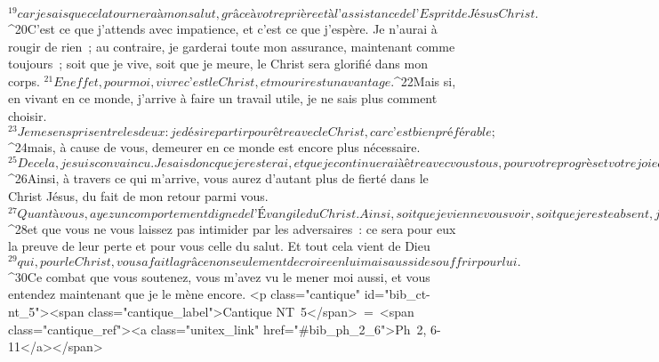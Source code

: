 ${}^{19}car je sais que cela tournera à mon salut, grâce à votre prière et à l’assistance de l’Esprit de Jésus Christ. 
${}^{20}C’est ce que j’attends avec impatience, et c’est ce que j’espère. Je n’aurai à rougir de rien ; au contraire, je garderai toute mon assurance, maintenant comme toujours ; soit que je vive, soit que je meure, le Christ sera glorifié dans mon corps. 
${}^{21}En effet, pour moi, vivre c’est le Christ, et mourir est un avantage. 
${}^{22}Mais si, en vivant en ce monde, j’arrive à faire un travail utile, je ne sais plus comment choisir. 
${}^{23}Je me sens pris entre les deux : je désire partir pour être avec le Christ, car c’est bien préférable ; 
${}^{24}mais, à cause de vous, demeurer en ce monde est encore plus nécessaire. 
${}^{25}De cela, je suis convaincu. Je sais donc que je resterai, et que je continuerai à être avec vous tous, pour votre progrès et votre joie dans la foi. 
${}^{26}Ainsi, à travers ce qui m’arrive, vous aurez d’autant plus de fierté dans le Christ Jésus, du fait de mon retour parmi vous.
${}^{27}Quant à vous, ayez un comportement digne de l’Évangile du Christ. Ainsi, soit que je vienne vous voir, soit que je reste absent, j’entendrai dire de vous que vous tenez bon dans un seul esprit, que vous luttez ensemble, d’une seule âme, pour la foi en l’Évangile, 
${}^{28}et que vous ne vous laissez pas intimider par les adversaires : ce sera pour eux la preuve de leur perte et pour vous celle du salut. Et tout cela vient de Dieu 
${}^{29}qui, pour le Christ, vous a fait la grâce non seulement de croire en lui mais aussi de souffrir pour lui. 
${}^{30}Ce combat que vous soutenez, vous m’avez vu le mener moi aussi, et vous entendez maintenant que je le mène encore.
      <p class="cantique" id="bib_ct-nt_5"><span class="cantique_label">Cantique NT 5</span> = <span class="cantique_ref"><a class="unitex_link" href="#bib_ph_2_6">Ph 2, 6-11</a></span>
      
